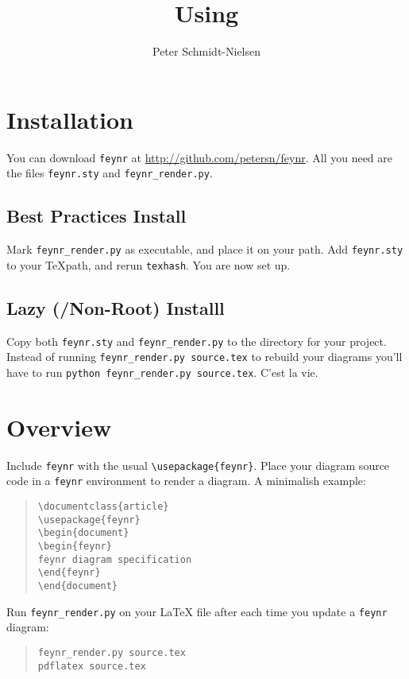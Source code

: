 \documentclass[12pt]{article}
\title{Using \feynR}
\author{Peter Schmidt-Nielsen}
\newcommand{\feynR}{\texttt{feynr}}
\begin{document}
\maketitle
\section*{Installation}
You can download \feynR{} at \url{http://github.com/petersn/feynr}.
All you need are the files \texttt{feynr.sty} and \texttt{feynr\_render.py}.
\subsection*{Best Practices Install}
Mark \texttt{feynr\_render.py} as executable, and place it on your path.
Add \texttt{feynr.sty} to your \TeX path, and rerun \texttt{texhash}.
You are now set up.
\subsection*{Lazy (/Non-Root) Installl}
Copy both \texttt{feynr.sty} and \texttt{feynr\_render.py} to the directory for your project.
Instead of running \texttt{feynr\_render.py source.tex} to rebuild your diagrams you'll have to run \texttt{python feynr\_render.py source.tex}.
C'est la vie.

\section*{Overview}
Include \feynR{} with the usual \texttt{\textbackslash{}usepackage\{feynr\}}.
Place your diagram source code in a \feynR{} environment to render a diagram.
A minimalish example:
\begin{quote}
\texttt{\textbackslash{}documentclass\{article\}\\
\textbackslash{}usepackage\{feynr\}\\
\textbackslash{}begin\{document\}\\
\textbackslash{}begin\{feynr\}\\
feynr diagram specification\\
\textbackslash{}end\{feynr\}\\
\textbackslash{}end\{document\}}
\end{quote} 
Run \texttt{feynr\_render.py} on your \LaTeX{} file after each time you update a \feynR{} diagram:
\begin{quote}
\texttt{feynr\_render.py source.tex}\\
\texttt{pdflatex source.tex}
\end{quote}
\end{document}
